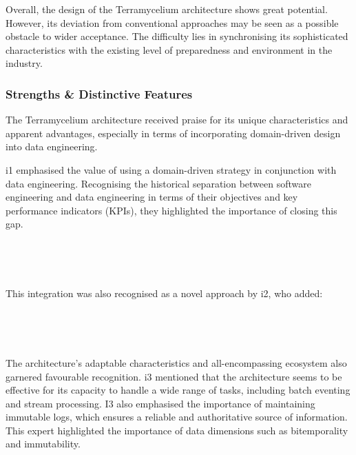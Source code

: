 \documentclass{ieeeaccess}
\begin{document}
Overall, the design of the Terramycelium architecture shows great potential. However, its deviation from conventional approaches may be seen as a possible obstacle to wider acceptance. The difficulty lies in synchronising its sophisticated characteristics with the existing level of preparedness and environment in the industry.

\subsubsection{Strengths \& Distinctive Features}

The Terramycelium architecture received praise for its unique characteristics and apparent advantages, especially in terms of incorporating domain-driven design into data engineering.

i1 emphasised the value of using a domain-driven strategy in conjunction with data engineering. Recognising the historical separation between software engineering and data engineering in terms of their objectives and key performance indicators (KPIs), they highlighted the importance of closing this gap.

\,

\setlength{\fboxsep}{0.3em}

\noindent{}

\,

This integration was also recognised as a novel approach by i2, who added:

\,

\setlength{\fboxsep}{0.3em}

\noindent{}

\,

The architecture's adaptable characteristics and all-encompassing ecosystem also garnered favourable recognition. i3 mentioned that the architecture seems to be effective for its capacity to handle a wide range of tasks, including batch eventing and stream processing. I3 also emphasised the importance of maintaining immutable logs, which ensures a reliable and authoritative source of information. This expert highlighted the importance of data dimensions such as bitemporality and immutability. 
\end{document}
